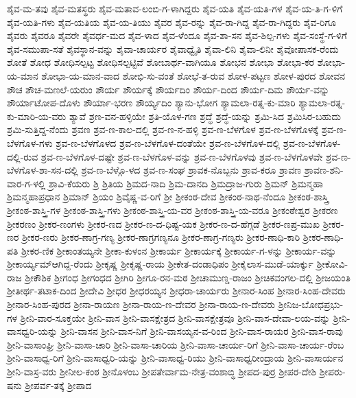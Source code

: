 ಶೈವ-ಮ-ತವು
ಶೈವ-ಮತಸ್ಥರು
ಶೈವ-ಮತಾವ-ಲಂಬಿ-ಗ-ಳಾಗಿದ್ದರು
ಶೈವ-ಯತಿ
ಶೈವ-ಯತಿ-ಗಳ
ಶೈವ-ಯ-ತಿ-ಗ-ಳಿಗೆ
ಶೈವ-ಯತಿ-ಗಳು
ಶೈವ-ಯತಿಯ
ಶೈವ-ಯ-ತಿಯು
ಶೈವರ
ಶೈವ-ರನ್ನು
ಶೈವ-ರಾ-ಗಿದ್ದ
ಶೈವ-ರಾ-ಗಿದ್ದರು
ಶೈವ-ರಿಗೂ
ಶೈವರು
ಶೈವರೂ
ಶೈವರೇ
ಶೈವರ್ಧ-ಮದ
ಶೈವ-ಳಾದ
ಶೈವ-ಳೆಂದೂ
ಶೈವ-ಶಾ-ಸನ
ಶೈವ-ಶಿಲ್ಪ-ಗಳು
ಶೈವ-ಸಂಸ್ಥೆ-ಗ-ಳಿಗೆ
ಶೈವ-ಸಮುಪಾ-ಸತೆ
ಶೈವಸ್ಥಾನ-ವನ್ನು
ಶೈವಾ-ಚಾರ್ಯರ
ಶೈವಾಧ್ವೈತಿ
ಶೈವಾ-ಲಿನಿ
ಶೈವಾ-ಲಿನೀ
ಶೈವೋಪಾಸಕ-ರೆಂದು
ಶೋತೆ
ಶೋಧ
ಶೋಧಿಸಲ್ಪಟ್ಟ
ಶೋಧಿಸಲ್ಪಟ್ಟಿವೆ
ಶೋಬಾರ್ಥ-ವಾಗಿಯೂ
ಶೋಭನ
ಶೋಭಾ
ಶೋಭಾ-ಕರ
ಶೋಭಾ-ಯ-ಮಾನ
ಶೋಭಾ-ಯ-ಮಾನ-ವಾದ
ಶೋಭಿ-ಸು-ವಂತೆ
ಶೋಭೆ-ತ-ರುವ
ಶೋಳ-ಪಟ್ಟಣ
ಶೋಳ-ಪುರದ
ಶೋವನ
ಶೌಚ
ಶೌಚ-ಮಣಲೆ-ಯರುಂ
ಶೌರ್ಯ
ಶೌರ್ಯಕ್ಕೆ
ಶೌರ್ಯದಿಂ
ಶೌರ್ಯ-ದಿಂದ
ಶೌರ್ಯ-ದಿಮ
ಶೌರ್ಯ-ವನ್ನು
ಶೌರ್ಯಾಟೋಪ-ದೊಳು
ಶೌರ್ಯಾ-ಭರಣ
ಶೌರ್ಯ್ಯದಿಂ
ಶ್ಯಾನು-ಭೋಗ
ಶ್ಯಾಮಲಾ-ರತ್ನ-ಕು-ಮಾರಿ
ಶ್ಯಾಮಲಾ-ರತ್ನ-ಕು-ಮಾರಿ-ಯ-ವರು
ಶ್ಯಾವೆ
ಶ್ರಣ-ವನ-ಹಳ್ಳಿಯೇ
ಶ್ರತಿ-ಯೊಳ-ಗಣ
ಶ್ರದ್ಧೆ
ಶ್ರದ್ಧೆ-ಯನ್ನು
ಶ್ರಮಿ-ಸಿದ
ಶ್ರಮಿಸಿರ-ಬಹುದು
ಶ್ರಮಿ-ಸುತ್ತಿದ್ದ-ನೆಂದು
ಶ್ರವಣ
ಶ್ರವ-ಣ-ಕಾಲ-ದಲ್ಲಿ
ಶ್ರವ-ಣ-ನ-ಹಳ್ಳಿ
ಶ್ರವ-ಣ-ಬೆಳಗೊಳ
ಶ್ರವ-ಣ-ಬೆಳಗೊಳಕ್ಕೆ
ಶ್ರವ-ಣ-ಬೆಳಗೊಳ-ಗಳು
ಶ್ರವ-ಣ-ಬೆಳಗೊಳದ
ಶ್ರವ-ಣ-ಬೆಳಗೊಳ-ದಂತೆಯೇ
ಶ್ರವ-ಣ-ಬೆಳಗೊಳ-ದಲ್ಲಿ
ಶ್ರವ-ಣ-ಬೆಳಗೊಳ-ದಲ್ಲಿ-ರುವ
ಶ್ರವ-ಣ-ಬೆಳಗೊಳ-ದಷ್ಟೇ
ಶ್ರವ-ಣ-ಬೆಳಗೊಳ-ವನ್ನು
ಶ್ರವ-ಣ-ಬೆಳಗೊಳವು
ಶ್ರವ-ಣ-ಬೆಳಗೊಳವೇ
ಶ್ರವ-ಣ-ಬೆಳಗೊಳ-ಶಾ-ಸನ-ದಲ್ಲಿ
ಶ್ರವ-ಣ-ಬೆಳ್ಗೊ-ಳದ
ಶ್ರವ-ಣ-ಸಂಘ
ಶ್ರಾವಕ-ನೊಬ್ಬನು
ಶ್ರಾವ-ಕರೂ
ಶ್ರಾವಣ
ಶ್ರಾವಣ-ಶನಿ-ವಾರ-ಗ-ಳಲ್ಲಿ
ಶ್ರಾವಿ-ಕೆಯರು
ಶ್ರಿ
ಶ್ರಿತಿಯ
ಶ್ರಿಮದ-ನಾದಿ
ಶ್ರಿಮ-ದಾನದಿ
ಶ್ರಿಮದ್ರಾಜ-ಗುರು
ಶ್ರಿಮನ್
ಶ್ರಿಮನ್ಮಹಾ
ಶ್ರಿಮನ್ಮಹಾಪ್ರಧಾನ
ಶ್ರಿಮಾನ್
ಶ್ರಿಯಂ
ಶ್ರಿವೈಷ್ಣ-ವ-ರಿಗೆ
ಶ್ರೀ
ಶ್ರೀಕಂಠ-ದೇವ
ಶ್ರೀಕಂಠ-ನಾಥ-ನೆಂದೂ
ಶ್ರೀಕಂಠ-ಶಾಸ್ತ್ರಿ
ಶ್ರೀಕಂಠ-ಶಾಸ್ತ್ರಿ-ಗಳ
ಶ್ರೀಕಂಠ-ಶಾಸ್ತ್ರಿ-ಗಳು
ಶ್ರೀಕಂಠ-ಶಾಸ್ತ್ರಿ-ಯ-ವರ
ಶ್ರೀಕಂಠ-ಶಾಸ್ತ್ರಿ-ಯ-ವರೂ
ಶ್ರೀಕಂಠೇಶ್ವರ
ಶ್ರೀಕರಣ
ಶ್ರೀಕರಣಂ
ಶ್ರೀಕರ-ಣಂಗಳು
ಶ್ರೀಕರ-ಣದ
ಶ್ರೀಕರ-ಣ-ದ-ಧಿಷ್ಟ-ಯಕ
ಶ್ರೀಕರ-ಣ-ದ-ಹೆಗ್ಗಡೆ
ಶ್ರೀಕರ-ಣಪ್ರ-ಮುಖ
ಶ್ರೀಕರ-ಣರ
ಶ್ರೀಕರ-ಣರು
ಶ್ರೀಕರ-ಣಾಗ್ರ-ಗಣ್ಯ
ಶ್ರೀಕರ-ಣಾಗ್ರಗಣ್ಯನೂ
ಶ್ರೀಕರ-ಣಾಗ್ರ-ಗಣ್ಯರು
ಶ್ರೀಕರ-ಣಾಧಿ-ಕಾರಿ
ಶ್ರೀಕರ-ಣಾಧಿ-ಪತಿ
ಶ್ರೀಕರ-ಣಿಕ
ಶ್ರೀಕಾಂತಯ್ಯನೇ
ಶ್ರೀಕಾ-ಕುಳಂನ
ಶ್ರೀಕಾರ್ಯ
ಶ್ರೀಕಾರ್ಯಕ್ಕೆ
ಶ್ರೀಕಾರ್ಯ-ಗ-ಳನ್ನು
ಶ್ರೀಕಾರ್ಯ-ವನ್ನು
ಶ್ರೀಕಾರ್ಯ್ಯಮ್ಆಗಿದ್ದ-ರೆಂದು
ಶ್ರೀಕೃಷ್ಣ
ಶ್ರೀಕೃಷ್ಣ-ರಾಯ
ಶ್ರೀಕೇತ-ದಂಡಾಧಿಪಂ
ಶ್ರೀಕೈಲಾಸ-ಮುಡೆ-ಯಾರ್ಕ್ಕು
ಶ್ರೀಕೋವಿ-ರಾಜ
ಶ್ರೀಕೌಶಿಕ
ಶ್ರೀಗಂಧ
ಶ್ರೀಗಂಧದ
ಶ್ರೀಗಿರಿ
ಶ್ರೀಗೂ-ರನ-ಮಠ
ಶ್ರೀಚಾಮುಣ್ಡ-ರಾಜಂ
ಶ್ರೀಚಿಕವಂಗಲ-ದಲ್ಲಿ
ಶ್ರೀಜಯಂತಿ
ಶ್ರೀತೀರ್ಥ-ತಟಾಕ-ದಿಂದ
ಶ್ರೀದೇವಿ
ಶ್ರೀಧರ
ಶ್ರೀಧರಯ್ಯನ
ಶ್ರೀಧರಾ-ಚಾರ್ಯರು
ಶ್ರೀನಾರ-ಸಿಂಹ
ಶ್ರೀನಾರ-ಸಿಂಹ-ದೇವರು
ಶ್ರೀನಾರ-ಸಿಂಹ-ಪುರದ
ಶ್ರೀನಾ-ರಾಯಣ
ಶ್ರೀನಾ-ರಾಯ-ಣ-ದೇವರ
ಶ್ರೀನಾ-ರಾಯ-ಣ-ದೇವರು
ಶ್ರೀನಿಜ-ಬೋಧಪ್ರಭು-ಗಳ
ಶ್ರೀನಿ-ವಾರ-ಸೂಕ್ತಯೇ
ಶ್ರೀನಿ-ವಾಸ
ಶ್ರೀನಿ-ವಾಸಕ್ಷೇತ್ರದ
ಶ್ರೀನಿ-ವಾಸಕ್ಷೇತ್ರವೂ
ಶ್ರೀನಿ-ವಾಸ-ದೇವಾ-ಲಯ-ವನ್ನು
ಶ್ರೀನಿ-ವಾಸಧ್ವರಿ-ಯನ್ನು
ಶ್ರೀನಿ-ವಾಸನ
ಶ್ರೀನಿ-ವಾಸ-ನಿಗೆ
ಶ್ರೀನಿ-ವಾಸಯ್ಯನ-ವ-ರಿಂದ
ಶ್ರೀನಿ-ವಾಸ-ರಾಯರ
ಶ್ರೀನಿ-ವಾಸ-ರಾವು
ಶ್ರೀನಿ-ವಾಸಾಂಘ್ರಿ
ಶ್ರೀನಿ-ವಾಸಾ-ಚಾರಿ
ಶ್ರೀನಿ-ವಾಸಾ-ಚಾರಿಯ
ಶ್ರೀನಿ-ವಾಸಾ-ಚಾರ್ಯ-ರಿಗೆ
ಶ್ರೀನಿ-ವಾಸಾ-ಚಾರ್ಯ-ರೆಂಬ
ಶ್ರೀನಿ-ವಾಸಾಧ್ವ-ರಿಗೆ
ಶ್ರೀನಿ-ವಾಸಾಧ್ವರಿ-ಯನ್ನು
ಶ್ರೀನಿ-ವಾಸಾಧ್ವ-ರಿಯು
ಶ್ರೀನಿ-ವಾಸಾಧ್ವರೀಂದ್ರಾಯ
ಶ್ರೀನಿ-ವಾಸಾರ್ಯನ
ಶ್ರೀನಿ-ವಾಸ್ರ-ವರು
ಶ್ರೀನೀಲ-ಕಂಠ
ಶ್ರೀನೊಳಂಬ
ಶ್ರೀಪತೇರ್ವಾಮ-ನೇತ್ರ-ವಂಶಾಬ್ಧಿ
ಶ್ರೀಪದ-ಪುರ್ರ
ಶ್ರೀಪರ-ದೇಶಿ
ಶ್ರೀಪರು-ಷನು
ಶ್ರೀಪರ್ವ-ತಕ್ಕೆ
ಶ್ರೀಪಾದ
